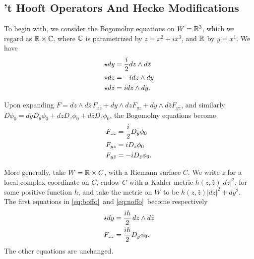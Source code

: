 
\subsection{'t Hooft Operators And Hecke Modifications}

\label{sec:theck}

To begin with, we consider the Bogomolny equations on
$W=\Bbb{R}^3$, which we regard  as $\Bbb{R}\times\Bbb{C}$, where
$\Bbb{C}$ is parametrized by $z=x^2+ix^3$, and $\Bbb{R}$ by
$y=x^1$.  We have %
\setcounter{equation}{5}
\begin{equation}\label{eq:boffo}
\begin{aligned}\star dy&={i\over 2}dz\wedge
d\bar z\\
        \star dz&=-idz\wedge dy\\
        \star d\bar z& = id\bar z\wedge dy.\\\end{aligned}
\end{equation}

        Upon expanding $F=dz\wedge d\bar z \,F_{z\bar z}+dy\wedge dz
        F_{yz}+dy\wedge d\bar z F_{y\bar z}$, and similarly
        $D\phi_0=dy D_y\phi_0+dz D_z\phi_0+d\bar z D_{\bar z}\phi_0$,
the Bogomolny equations become %
\setcounter{equation}{6}
\begin{equation}\label{eq:noffo}
\begin{aligned}F_{z\bar
z}&={i\over 2}D_y\phi_0\\
                    F_{yz}&=iD_z\phi_0\\
                    F_{y\bar z}&=-iD_{\bar z}\phi_0.\\\end{aligned}
\end{equation}

More generally, take $W= \Bbb{R}\times C$, with a Riemann surface
$C$. We write $z$ for a local complex coordinate on $C$, endow $C$
with a Kahler metric $h(z,\bar z)|dz|^2$, for some positive
function $h$, and take the metric on $W$ to be $h(z,\bar
z)|dz|^2+dy^2$. The first equations in \eqref{eq:boffo}\ and \eqref{eq:noffo}\ become
respectively %
\setcounter{equation}{7}
\begin{equation}\label{eq:jungol}
\begin{aligned}\star dy& ={ih\over 2}\,dz\wedge
d\bar z\\ F_{z\bar z}&={ih\over 2}D_y\phi_0.\end{aligned}
\end{equation}
 The other
equations are unchanged.

